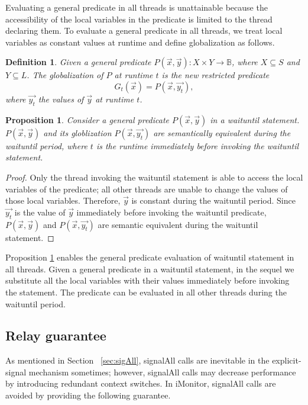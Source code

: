 \documentclass[preprint]{sigplanconf}
\newtheorem{definition}{Definition}
\newtheorem{proposition}{Proposition}
\begin{document}
Evaluating a general predicate in all threads is unattainable 
because the accessibility of the local variables in the predicate is limited 
to the thread declaring them. To evaluate a general predicate in all 
threads, we treat local variables as constant values at runtime and define 
globalization as follows. 
\begin{definition}
    Given a general predicate $P(\vec{x}, \vec{y}): X \times Y \rightarrow 
    \mathbb{B}$, where $X \subseteq S$ and $Y \subseteq L$. The globalization 
    of $P$ at runtime $t$ is the new restricted predicate
    \[
    G_t(\vec{x}) = P(\vec{x}, \vec{y_t}),
    \]
    where $\vec{y_t}$ the values of $\vec{y}$ at runtime $t$.
\end{definition}
\begin{proposition} \label{pro:glob}
    Consider a general predicate $P(\vec{x}, \vec{y})$ in a waituntil 
    statement. $P(\vec{x}, \vec{y})$ and its globlization 
    $P(\vec{x}, \vec{y_t})$ are semantically equivalent during the waituntil 
    period, where $t$ is the runtime immediately before invoking the 
    waituntil statement.  
\end{proposition}
\begin{proof}
    Only the thread invoking the waituntil statement is able to access the
    local variables of the predicate; all other threads are unable to change
    the values of those local variables. Therefore, $\vec{y}$ is constant 
    during the waituntil period. Since $\vec{y_t}$ is the value of $\vec{y}$
    immediately before invoking the waituntil predicate, $P(\vec{x}, \vec{y})$
    and $P(\vec{x}, \vec{y_t})$ are semantic equivalent during the waituntil
    statement. 
\end{proof}

Proposition \ref{pro:glob} enables the general predicate evaluation of
waituntil statement in all threads. 
Given a general predicate in a waituntil statement, in the sequel we substitute
all the local variables with their values immediately before invoking the
statement. The predicate can be evaluated in all other threads during the
waituntil period. 

\subsection{Relay guarantee}
As mentioned in Section ~\ref{sec:sigAll}, signalAll calls are inevitable in
the explicit-signal mechanism sometimes; however, signalAll calls may decrease
performance by introducing redundant context switches. 
In
iMonitor, signalAll calls are avoided by providing the following guarantee. 
\end{document}
